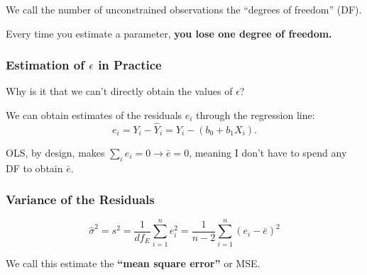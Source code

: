 \documentclass[12pt]{../notes}
\begin{document}
\nspace
We call the number of unconstrained observations the ``degrees of freedom'' (DF). 

\nspace
Every time you estimate a parameter, \textbf{you lose one degree of freedom.}

\begin{minipage}[l][2cm][c]{\textwidth}
\end{minipage}

\subsubsection*{Estimation of $\epsilon$ in Practice}

Why is it that we can't directly obtain the values of $\epsilon$?

\begin{minipage}[l][2cm][c]{\textwidth}
\end{minipage}

We can obtain estimates of the residuals $e_i$ through the regression line: 
\[
e_i = Y_i - \hat{Y}_i = Y_i - (b_0 + b_1X_i).
\]

\nspace
OLS, by design, makes $\sum_ie_i = 0 \rightarrow \bar{e} = 0$, meaning I don't have to spend any DF to obtain $\bar{e}$. 


\subsubsection*{Variance of the Residuals}

\[\hat{\sigma}^2 = s^2 = \frac{1}{df_E}\sum_{i=1}^ne_i^2 = \frac{1}{n-2}\sum_{i=1}^n\left(e_i-\bar{e}\right)^2\]

We call this estimate the \textbf{``mean square error''} or MSE. 


\end{document}
